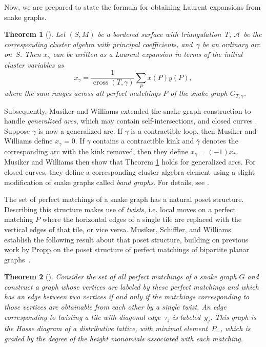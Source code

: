 \documentclass[11pt]{article}
\numberwithin{equation}{section}
\newtheorem{Theorem}{Theorem}[section]
\begin{document}
Now, we are prepared to state the formula for obtaining Laurent expansions from snake graphs.

\begin{Theorem}[{\cite[Theorem 4.9]{MSW}}]\label{theorem:clusterExpansion_ordinary}
Let $(S,M)$ be a bordered surface with triangulation~$T$, $\mathcal{A}$~be the corresponding cluster algebra with principal coefficients, and~$\gamma$ be an ordinary arc on~$S$. Then $x_\gamma$ can be written as a Laurent expansion in terms of the initial cluster variables as
\[ x_\gamma = \frac{1}{\operatorname{cross}(T,\gamma)}\sum_P x(P)y(P), \]
where the sum ranges across all perfect matchings $P$ of the snake graph $G_{T,\gamma}$.
\end{Theorem}

Subsequently, Musiker and Williams extended the snake graph construction to handle \emph{generalized arcs}, which may contain self-intersections, and closed curves \cite{MW}. Suppose $\gamma$ is now a generalized arc. If $\gamma$ is a contractible loop, then Musiker and Williams define $x_\gamma = 0$. If $\gamma$ contains a contractible kink and $\overline{\gamma}$ denotes the corresponding arc with the kink removed, then they define $x_\gamma = (-1)x_{\overline{\gamma}}$. Musiker and Williams then show that Theorem \ref{theorem:clusterExpansion_ordinary} holds for generalized arcs. For closed curves, they define a corresponding cluster algebra element using a slight modification of snake graphs called \emph{band graphs}. For details, see \cite[Section~3]{MW}.

The set of perfect matchings of a snake graph has a natural poset structure. Describing this structure makes use of \emph{twists}, i.e. local moves on a perfect matching $P$ where the horizontal edges of a single tile are replaced with the vertical edges of that tile, or vice versa. Musiker, Schiffler, and Williams~\cite{MSW-bases} establish the following result about that poset structure, building on previous work by Propp on the poset structure of perfect matchings of bipartite planar graphs~\cite{Propp}.

\begin{Theorem}[{\cite[Theorem 5.2]{MSW-bases}}]\label{Thm:PMPoset}
Consider the set of all perfect matchings of a snake graph $G$ and construct a graph whose vertices are labeled by these perfect matchings and which has an edge between two vertices if and only if the matchings corresponding to those vertices are obtainable from each other by a single twist. An edge corresponding to twisting a tile with diagonal edge~$\tau_j$ is labeled~$y_j$. This graph is the Hasse diagram of a distributive lattice, with minimal element~$P_{-}$, which is graded by the degree of the height monomials associated with each matching.
\end{Theorem}
\end{document}
